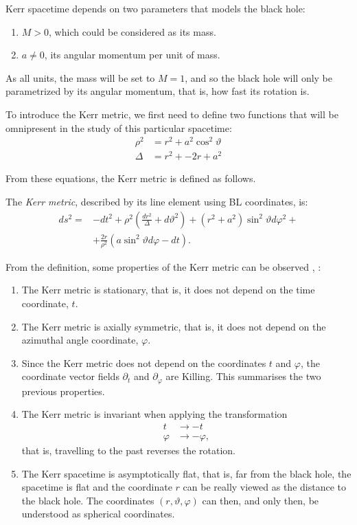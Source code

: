 Kerr spacetime depends on two parameters that models the black hole:
\begin{enumerate}
	\item $M > 0$, which could be considered as its mass.
	\item $a \neq 0$, its angular momentum per unit of mass.
\end{enumerate}

As all units, the mass will be set to $M = 1$, and so the black hole will only be parametrized by its angular momentum, that is, how fast its rotation is.

To introduce the Kerr metric, we first need to define two functions that will be omnipresent in the study of this particular spacetime:
\begin{align}
	\rho^2 &= r^2 + a^2\cos^2\vartheta \\
	\Delta &= r^2 + -2r + a^2
\end{align}

From these equations, the Kerr metric is defined as follows.
\begin{definition}
	The \emph{Kerr metric}, described by its line element using \ac{BL} coordinates, is:
	\begin{align}
		\label{eq:kerrmetric}
		ds^2 = &-dt^2 + \rho^2\left(\frac{dr^2}{\Delta} + d\vartheta^2\right) + \left(r^2 + a^2\right)\sin^2\vartheta d\varphi^2 + \\
		\nonumber
		&+ \frac{2r}{\rho^2}\left(a\sin^2\vartheta d\varphi - dt\right).
	\end{align}
\end{definition}

From the definition, some properties of the Kerr metric can be observed \cite[Sec. 2.1]{galindo14}, \cite[pp. 58-59]{oneill95}:
\begin{enumerate}
	\item The Kerr metric is stationary, that is, it does not depend on the time coordinate, $t$.
	\item The Kerr metric is axially symmetric, that is, it does not depend on the azimuthal angle coordinate, $\varphi$.
	\item Since the Kerr metric does not depend on the coordinates $t$ and $\varphi$, the coordinate vector fields $\partial_t$ and $\partial_\varphi$ are Killing. This summarises the two previous properties.
	\item The Kerr metric is invariant when applying the transformation
	\begin{align*}
		t &\to -t \\
		\varphi &\to -\varphi,
	\end{align*}
	that is, travelling to the past reverses the rotation.
	\item The Kerr spacetime is asymptotically flat, that is, far from the black hole, the spacetime is flat and the coordinate $r$ can be really viewed as the distance to the black hole. The coordinates $(r, \vartheta, \varphi)$ can then, and only then, be understood as spherical coordinates.
\end{enumerate}


